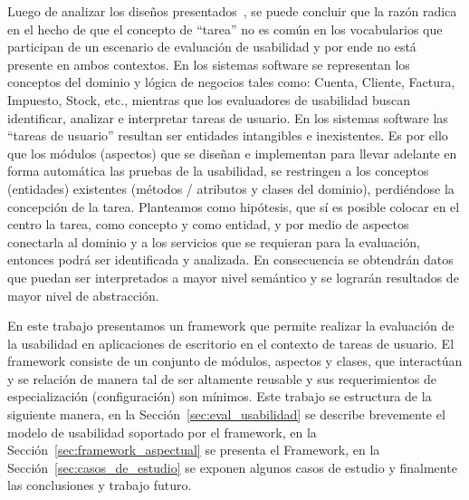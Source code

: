 Luego de analizar los diseños presentados~\cite{TM2006,ST2010,HBS2011,TAO2008,TAO2012,BGO+2009,HDC2009}, se puede concluir que la razón radica en el hecho de que el concepto de “tarea” no es común en los vocabularios que participan de un escenario de evaluación de usabilidad y por ende no está presente en ambos contextos. En los sistemas software se representan los conceptos del dominio y lógica de negocios tales como: Cuenta, Cliente, Factura, Impuesto, Stock, etc., mientras que los evaluadores de usabilidad buscan identificar, analizar e interpretar  tareas de usuario. En los sistemas software  las “tareas de usuario” resultan ser entidades intangibles e inexistentes. Es por ello que los módulos (aspectos) que se diseñan e implementan para llevar adelante en forma automática las pruebas de la usabilidad, se restringen a los conceptos (entidades) existentes (métodos / atributos y clases del dominio), perdiéndose la concepción de la tarea. Planteamos como hipótesis, que sí es posible colocar en el centro la tarea, como concepto y como entidad, y por medio de aspectos conectarla al dominio y a los servicios que se requieran para la evaluación, entonces podrá ser identificada y analizada. En consecuencia se obtendrán datos que puedan ser interpretados a mayor nivel semántico y se lograrán resultados de mayor nivel de abstracción. 

En este trabajo presentamos un framework que permite realizar la evaluación de la usabilidad en aplicaciones de escritorio en el contexto de tareas de usuario. El framework consiste de un conjunto de módulos, aspectos y clases, que interactúan y se relación de manera tal de ser altamente reusable y sus requerimientos de especialización (configuración) son mínimos. 
Este trabajo se estructura de la siguiente manera, en la Sección~\ref{sec:eval_usabilidad} se describe brevemente el modelo de usabilidad soportado por el framework, en la Sección~\ref{sec:framework_aspectual} se presenta el Framework, en la Sección~\ref{sec:casos_de_estudio} se exponen algunos casos de estudio y finalmente las conclusiones y trabajo futuro. 
